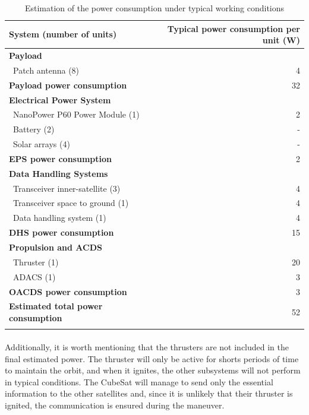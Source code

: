 \begin{longtable}{| l | r | }
\hline
\rowcolor[gray]{0.80}	\textbf{System (number of units)} &  \textbf{Typical power consumption per unit (W)} \\
\hline
\endfirsthead

\rowcolor[gray]{0.85} \textbf{Payload} &  \\
	   ~Patch antenna (8) & 4 \\
	   \rowcolor[gray]{0.95} \textbf{Payload power consumption} & 32 \\
	   \hline
	\hline

\rowcolor[gray]{0.85} \textbf{Electrical Power System} &  \\
	   ~NanoPower P60 Power Module (1) & 2 \\
	   ~Battery (2) & - \\
	   ~Solar arrays (4) & -\\
	   \rowcolor[gray]{0.95} \textbf{EPS power consumption} & 2 \\
	   \hline
	\hline
	
\rowcolor[gray]{0.85} \textbf{Data Handling Systems} &  \\
	   ~Transceiver inner-satellite (3) & 4 \\
	   ~Transceiver space to ground (1) & 4 \\
	   ~Data handling system (1) & 4 \\
	   \rowcolor[gray]{0.95} \textbf{DHS power consumption} & 15 \\
	   \hline
	\hline
	
\rowcolor[gray]{0.85} \textbf{Propulsion and ACDS} &  \\
	   ~Thruster (1) & 20 \\
	   ~ADACS (1) & 3 \\
	   \rowcolor[gray]{0.95} \textbf{OACDS power consumption} & 3 \\
	   \hline
	\hline

\rowcolor[gray]{0.65} \textbf{Estimated total power consumption} & 52 \\

\caption{Estimation of the power consumption under typical working conditions}
\label{powerestimation}
\end{longtable}

\paragraph{}Additionally, it is worth mentioning that the thrusters are not included in the final estimated power. The thruster will only be active for shorts periods of time to maintain the orbit, and when it ignites, the other subsystems will not perform in typical conditions. The CubeSat will manage to send only the essential information to the other satellites and, since it is unlikely that their thruster is ignited, the communication is ensured during the maneuver.

